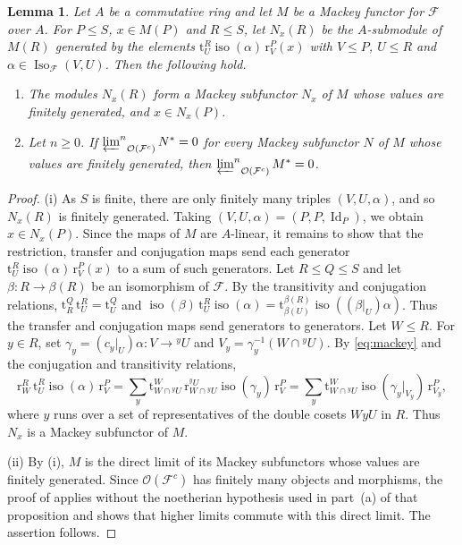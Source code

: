 \documentclass[10pt]{amsart}
\newtheorem{lemma}[theorem]{Lemma}
\theoremstyle{definition}
\numberwithin{equation}{section}
\renewcommand{\le}{\leqslant}
\renewcommand{\ge}{\geqslant}
\newcommand{\F}{\mathcal F}
\newcommand{\Op}{\mathcal O}
\newcommand{\Iso}{\operatorname{Iso}}
\newcommand{\limi}[2]{\mathop{\varprojlim\nolimits^{#1}}_{#2}}
\begin{document}
\begin{samepage}
\begin{lemma}\label{lem:closure}
Let $A$ be a commutative ring and let $M$ be a Mackey functor for $\F$ over $A$. For $P\le S$, $x\in M(P)$ and $R\le S$, let $N_x(R)$ be the $A$-submodule of $M(R)$ generated by the elements $\mathrm{t}^R_U\operatorname{iso}(\alpha)\,\mathrm{r}^P_V(x)$ with $V\le P$, $U\le R$ and $\alpha\in\Iso_\F(V,U)$. Then the following hold.
\begin{enumerate}[label=\textup{(\roman*)}]
\item The modules $N_x(R)$ form a Mackey subfunctor $N_x$ of $M$ whose values are finitely generated, and $x\in N_x(P)$.
\item Let $n\ge0$. If $\limi{n}{\Op(\F^c)}N^*=0$ for every Mackey subfunctor $N$ of $M$ whose values are finitely generated, then $\limi{n}{\Op(\F^c)}M^*=0$.
\end{enumerate}
\end{lemma}
\end{samepage}

\begin{proof}
(i) As $S$ is finite, there are only finitely many triples $(V,U,\alpha)$, and so $N_x(R)$ is finitely generated. Taking $(V,U,\alpha)=(P,P,\operatorname{Id}_P)$, we obtain $x\in N_x(P)$. Since the maps of $M$ are $A$-linear, it remains to show that the restriction, transfer and conjugation maps send each generator $\mathrm{t}^R_U\operatorname{iso}(\alpha)\,\mathrm{r}^P_V(x)$ to a sum of such generators. Let $R\le Q\le S$ and let $\beta\colon R\to\beta(R)$ be an isomorphism of $\F$. By the transitivity and conjugation relations, $\mathrm{t}^Q_R\,\mathrm{t}^R_U=\mathrm{t}^Q_U$ and $\operatorname{iso}(\beta)\,\mathrm{t}^R_U\operatorname{iso}(\alpha)=\mathrm{t}^{\beta(R)}_{\beta(U)}\operatorname{iso}((\beta|_U)\alpha)$. Thus the transfer and conjugation maps send generators to generators. Let $W\le R$. For $y\in R$, set $\gamma_y=(c_y|_U)\alpha\colon V\to{}^yU$ and $V_y=\gamma_y^{-1}(W\cap{}^yU)$. By \eqref{eq:mackey} and the conjugation and transitivity relations,
\[
\mathrm{r}^R_W\,\mathrm{t}^R_U\operatorname{iso}(\alpha)\,\mathrm{r}^P_V=\sum_y\mathrm{t}^W_{W\cap{}^yU}\,\mathrm{r}^{{}^yU}_{W\cap{}^yU}\operatorname{iso}(\gamma_y)\,\mathrm{r}^P_V=\sum_y\mathrm{t}^W_{W\cap{}^yU}\operatorname{iso}(\gamma_y|_{V_y})\,\mathrm{r}^P_{V_y},
\]
where $y$ runs over a set of representatives of the double cosets $WyU$ in $R$. Thus $N_x$ is a Mackey subfunctor of $M$.

(ii) By (i), $M$ is the direct limit of its Mackey subfunctors whose values are finitely generated. Since $\Op(\F^c)$ has finitely many objects and morphisms, the proof of \cite[Proposition~III.5.5(b)]{AKO} applies without the noetherian hypothesis used in part~(a) of that proposition and shows that higher limits commute with this direct limit. The assertion follows.
\end{proof}
\end{document}
